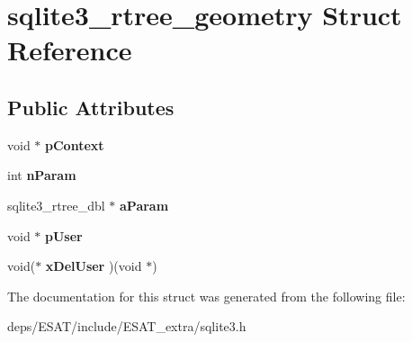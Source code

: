 \hypertarget{structsqlite3__rtree__geometry}{}\section{sqlite3\+\_\+rtree\+\_\+geometry Struct Reference}
\label{structsqlite3__rtree__geometry}
\subsection*{Public Attributes}
\begin{DoxyCompactItemize}
\item 
\mbox{\label{structsqlite3__rtree__geometry_a62fe439a49ed5b8628464c418f35f572}} 
void $\ast$ {\bfseries p\+Context}
\item 
\mbox{\label{structsqlite3__rtree__geometry_ada7b9eba82660e3321dd4c93526697c9}} 
int {\bfseries n\+Param}
\item 
\mbox{\label{structsqlite3__rtree__geometry_a0a22e4b810cb1b8f1af792fd50493002}} 
sqlite3\+\_\+rtree\+\_\+dbl $\ast$ {\bfseries a\+Param}
\item 
\mbox{\label{structsqlite3__rtree__geometry_add62e1cd5faa6000c815104af3c540d0}} 
void $\ast$ {\bfseries p\+User}
\item 
\mbox{\label{structsqlite3__rtree__geometry_ae9835a39924a75b33cce9f6b10e1813f}} 
void($\ast$ {\bfseries x\+Del\+User} )(void $\ast$)
\end{DoxyCompactItemize}


The documentation for this struct was generated from the following file\+:\begin{DoxyCompactItemize}
\item 
deps/\+E\+S\+A\+T/include/\+E\+S\+A\+T\+\_\+extra/sqlite3.\+h\end{DoxyCompactItemize}
